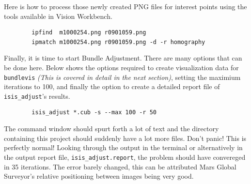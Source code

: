 Here is how to process those newly created PNG files for interest points using the tools available in Vision Workbench.

\begin{verbatim}
        ipfind  m1000254.png r0901059.png
        ipmatch m1000254.png r0901059.png -d -r homography
\end{verbatim}

\begin{center}
\end{center}

Finally, it is time to start Bundle Adjustment. There are many options
that can be done here. Below shows the options required to create
visualization data for \texttt{bundlevis} \emph{(This is covered in
  detail in the next section)}, setting the maximium iterations to
100, and finally the option to create a detailed report file of
\texttt{isis\_adjust}'s results.

\begin{verbatim}
        isis_adjust *.cub -s --max 100 -r 50
\end{verbatim}

The command window should spurt forth a lot of text and the directory
containing this project should suddenly have a lot more files. Don't
panic! This is perfectly normal! Looking through the output in the
terminal or alternatively in the output report file,
\verb=isis_adjust.report=, the problem should have convereged in 35
iterations. The error barely changed, this can be attributed Mars
Global Surveyor's relative positioning between images being very good. 

